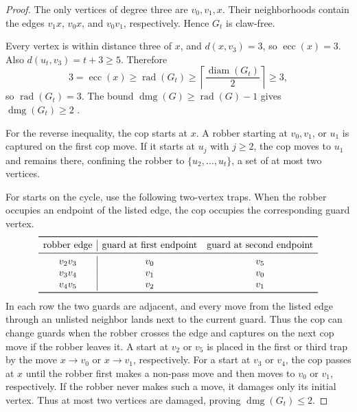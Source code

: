 \documentclass[11pt]{amsart}
\DeclareMathOperator{\dmg}{dmg}
\begin{document}
\begin{proof}
The only vertices of degree three are $v_0,v_1,x$. Their neighborhoods
contain the edges $v_1x$, $v_0x$, and $v_0v_1$, respectively. Hence $G_t$
is claw-free.

Every vertex is within distance three of $x$, and $d(x,v_3)=3$, so
$\operatorname{ecc}(x)=3$. Also $d(u_t,v_3)=t+3\geq5$. Therefore
\[
  3=\operatorname{ecc}(x)\geq\operatorname{rad}(G_t)
  \geq\left\lceil\frac{\operatorname{diam}(G_t)}2\right\rceil\geq3,
\]
so $\operatorname{rad}(G_t)=3$. The bound
$\dmg(G)\geq\operatorname{rad}(G)-1$ gives $\dmg(G_t)\geq2$
\cite[Theorem~1.3]{HugganMessingerPorter}.

For the reverse inequality, the cop starts at $x$. A robber starting at
$v_0,v_1$, or $u_1$ is captured on the first cop move. If it starts at
$u_j$ with $j\geq2$, the cop moves to $u_1$ and remains there, confining the
robber to $\{u_2,\ldots,u_t\}$, a set of at most two vertices.

For starts on the cycle, use the following two-vertex traps. When the robber
occupies an endpoint of the listed edge, the cop occupies the corresponding
guard vertex.
\[
\begin{array}{c|cc}
\toprule
\text{robber edge} & \text{guard at first endpoint} &
                      \text{guard at second endpoint}\\
\midrule
v_2v_3 & v_0 & v_5\\
v_3v_4 & v_1 & v_0\\
v_4v_5 & v_2 & v_1\\
\bottomrule
\end{array}
\]
In each row the two guards are adjacent, and every move from the listed edge
through an unlisted neighbor lands next to the current guard. Thus the cop
can change guards when the robber crosses the edge and captures on the next
cop move if the robber leaves it. A start at $v_2$ or $v_5$ is placed in the
first or third trap by the move $x\to v_0$ or $x\to v_1$, respectively.
For a start at $v_3$ or $v_4$, the cop passes at $x$ until the robber first
makes a non-pass move and then moves to $v_0$ or $v_1$, respectively. If the
robber never makes such a move, it damages only its initial vertex. Thus at
most two vertices are damaged, proving $\dmg(G_t)\leq2$.


\end{proof}
\end{document}
